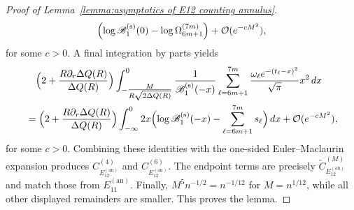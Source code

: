 \documentclass[a4paper]{article}
\numberwithin{equation}{section}
\begin{document}
\begin{proof}[Proof of Lemma~\ref{lemma:asymptotics of E12 counting annulus}]
\begin{align*}
\Bigl( 
\log\mathscr{B}_1^{(\rm s)}(0)
-\log\Omega_{6m+1}^{(7m)}
\Bigr)
+\mathcal{O}(e^{-cM^2}),
\end{align*}
for some $c>0$.  A final integration by parts yields
\begin{align*}
 &\quad
 \Bigl(
2+\frac{R\partial_r\Delta Q(R)}{\Delta Q(R)}
\Bigr)
\int_{-\tfrac{M}{R\sqrt{2\Delta Q(R)}}}^{0}
\frac{1}{\mathscr{B}_1^{(\rm s)}(-x)}
\sum_{\ell=6m+1}^{7m}
\frac{\omega_{\ell}e^{-(t_{\ell}-x)^2}}{\sqrt{\pi}}
x^2
\,dx
\\
&=
\Bigl(
2+\frac{R\partial_r\Delta Q(R)}{\Delta Q(R)}
\Bigr)
\int_{-\infty}^{0}
2x 
\Bigl(\log\mathscr{B}_1^{(\rm s)}(-x)
-\sum_{\ell=6m+1}^{7m}s_{\ell}
\Bigr)
\,dx
+\mathcal{O}(e^{-cM^2}),
\end{align*}
for some $c>0$.  Combining these identities with the one-sided
Euler--Maclaurin expansion produces $C_{E_{12}^{(\mathrm{an})}}^{(4)}$ and
$C_{E_{12}^{(\mathrm{an})}}^{(6)}$.  The endpoint terms are precisely
$\widetilde C_{E_{12}^{(\mathrm{an})}}^{(M)}$ and match those from
$E_{11}^{(\mathrm{an})}$.  Finally,
$M^5n^{-1/2}=n^{-1/12}$ for $M=n^{1/12}$, while all other displayed
remainders are smaller.  This proves the lemma.

\end{proof}
\end{document}

